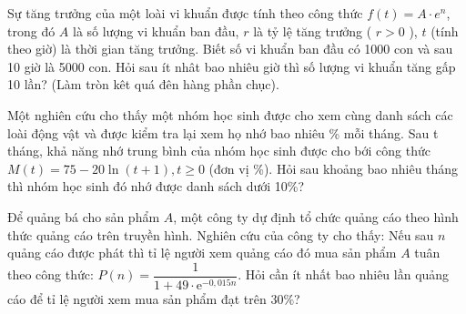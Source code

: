 \begin{ex}
Sự tăng trưởng của một loài vi khuẩn được tính theo công thức $f(t)=A \cdot e^n$, trong đó $A$ là số lượng vi khuẩn ban đầu, $r$ là tỷ lệ tăng trưởng ( $r>0$ ), $t$ (tính theo giờ) là thời gian tăng trưởng. Biết số vi khuẩn ban đầu có 1000 con và sau 10 giờ là 5000 con. Hỏi sau ít nhât bao nhiêu giờ thì số lượng vi khuẩn tăng gấp 10 lần? (Làm tròn kêt quá đên hàng phần chục).\\
\end{ex}


\begin{ex}%
	Một nghiên cứu cho thấy một nhóm học sinh được cho xem cùng danh sách các loài động vật và được kiểm tra lại xem họ nhớ bao nhiêu \% mỗi tháng. Sau t tháng, khả năng nhớ trung bình của nhóm học sinh được cho bới công thức $M(t)=75-20\ln (t+1 ),t\ge 0$ (đơn vị \%). Hỏi sau khoảng bao nhiêu tháng thì nhóm học sinh đó nhớ được danh sách dưới 10\%?\\
\end{ex}

\begin{ex}%
	Để quảng bá cho sản phẩm $A$, một công ty dự định tổ chức quảng cáo theo hình thức quảng cáo trên truyền hình. Nghiên cứu của công ty cho thấy: Nếu sau $n$ quảng cáo được phát thì tỉ lệ người xem quảng cáo đó mua sản phẩm $A$ tuân theo công thức: $P(n)=\dfrac{1}{1+49 \cdot \mathrm{e}^{-0,015n}}$. Hỏi cần ít nhất bao nhiêu lần quảng cáo để tỉ lệ người xem mua sản phẩm đạt trên $30\%$?
	\\
\end{ex}


